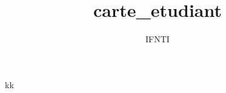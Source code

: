 \documentclass[a4paper, 13pt]{article}
\author{IFNTI}
\title{carte_etudiant}
\makeatletter
\newcommand\HUGE{\@setfontsize\Huge {30}{36}}
\newcommand\BackgroundPicCorps{
\put(0,0){
\parbox[b][\paperheight]{\paperwidth}{
\texttt{[image: \\VAR\{image\_path]}carte_graphique6.png}
}}}
\makeatother
\begin{document}
kk






\end{document}
